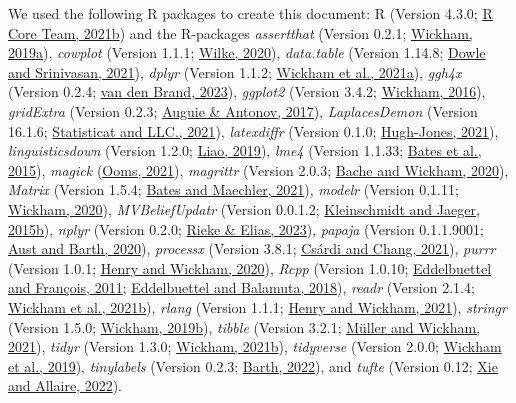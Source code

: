 \documentclass[utf8]{frontiers_suppmat} %
\begin{document}
We used the following R packages to create this document: R (Version 4.3.0; \protect\hyperlink{ref-R-base}{R Core Team, 2021b}) and the R-packages \emph{assertthat} (Version 0.2.1; \protect\hyperlink{ref-R-assertthat}{Wickham, 2019a}), \emph{cowplot} (Version 1.1.1; \protect\hyperlink{ref-R-cowplot}{Wilke, 2020}), \emph{data.table} (Version 1.14.8; \protect\hyperlink{ref-R-data.table}{Dowle and Srinivasan, 2021}), \emph{dplyr} (Version 1.1.2; \protect\hyperlink{ref-R-dplyr}{Wickham et al., 2021a}), \emph{ggh4x} (Version 0.2.4; \protect\hyperlink{ref-R-ggh4x}{van den Brand, 2023}), \emph{ggplot2} (Version 3.4.2; \protect\hyperlink{ref-R-ggplot2}{Wickham, 2016}), \emph{gridExtra} (Version 0.2.3; \protect\hyperlink{ref-R-gridExtra}{Auguie \& Antonov, 2017}), \emph{LaplacesDemon} (Version 16.1.6; \protect\hyperlink{ref-R-LaplacesDemon}{Statisticat and LLC., 2021}), \emph{latexdiffr} (Version 0.1.0; \protect\hyperlink{ref-R-latexdiffr}{Hugh-Jones, 2021}), \emph{linguisticsdown} (Version 1.2.0; \protect\hyperlink{ref-R-linguisticsdown}{Liao, 2019}), \emph{lme4} (Version 1.1.33; \protect\hyperlink{ref-R-lme4}{Bates et al., 2015}), \emph{magick} (\protect\hyperlink{ref-R-magick}{Ooms, 2021}), \emph{magrittr} (Version 2.0.3; \protect\hyperlink{ref-R-magrittr}{Bache and Wickham, 2020}), \emph{Matrix} (Version 1.5.4; \protect\hyperlink{ref-R-Matrix}{Bates and Maechler, 2021}), \emph{modelr} (Version 0.1.11; \protect\hyperlink{ref-R-modelr}{Wickham, 2020}), \emph{MVBeliefUpdatr} (Version 0.0.1.2; \protect\hyperlink{ref-R-MVBeliefUpdatr}{Kleinschmidt and Jaeger, 2015b}), \emph{nplyr} (Version 0.2.0; \protect\hyperlink{ref-R-nplyr}{Rieke \& Elias, 2023}), \emph{papaja} (Version 0.1.1.9001; \protect\hyperlink{ref-R-papaja}{Aust and Barth, 2020}), \emph{processx} (Version 3.8.1; \protect\hyperlink{ref-R-processx}{Csárdi and Chang, 2021}), \emph{purrr} (Version 1.0.1; \protect\hyperlink{ref-R-purrr}{Henry and Wickham, 2020}), \emph{Rcpp} (Version 1.0.10; \protect\hyperlink{ref-R-Rcpp_a}{Eddelbuettel and François, 2011}; \protect\hyperlink{ref-R-Rcpp_b}{Eddelbuettel and Balamuta, 2018}), \emph{readr} (Version 2.1.4; \protect\hyperlink{ref-R-readr}{Wickham et al., 2021b}), \emph{rlang} (Version 1.1.1; \protect\hyperlink{ref-R-rlang}{Henry and Wickham, 2021}), \emph{stringr} (Version 1.5.0; \protect\hyperlink{ref-R-stringr}{Wickham, 2019b}), \emph{tibble} (Version 3.2.1; \protect\hyperlink{ref-R-tibble}{Müller and Wickham, 2021}), \emph{tidyr} (Version 1.3.0; \protect\hyperlink{ref-R-tidyr}{Wickham, 2021b}), \emph{tidyverse} (Version 2.0.0; \protect\hyperlink{ref-R-tidyverse}{Wickham et al., 2019}), \emph{tinylabels} (Version 0.2.3; \protect\hyperlink{ref-R-tinylabels}{Barth, 2022}), and \emph{tufte} (Version 0.12; \protect\hyperlink{ref-R-tufte}{Xie and Allaire, 2022}).
\end{document}
